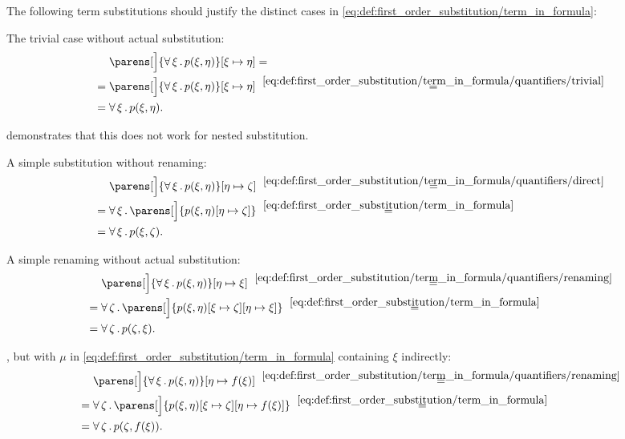 \begin{example}\label{ex:first_order_substitution}
  The following term substitutions should justify the distinct cases in \eqref{eq:def:first_order_substitution/term_in_formula}:
  \begin{thmenum}
     The trivial case without actual substitution:
    \begin{align*}
      &\phantom{{}={}}
      \parens[\Big]{\qforall \xi p(\xi, \eta)}[\xi \mapsto \eta]
      = \\ &=
      \parens[\Big]{\qforall \xi p(\xi, \eta)}[\xi \mapsto \eta]
      \reloset {\eqref{eq:def:first_order_substitution/term_in_formula/quantifiers/trivial}} = \\ &=
      \qforall \xi p(\xi, \eta).
    \end{align*}

     demonstrates that this does not work for nested substitution.

     A simple substitution without renaming:
    \begin{align*}
      &\phantom{{}={}}
      \parens[\Big]{\qforall \xi p(\xi, \eta)}[\eta \mapsto \zeta]
      \reloset {\eqref{eq:def:first_order_substitution/term_in_formula/quantifiers/direct}} = \\ &=
      \qforall \xi \parens[\Big]{p(\xi, \eta)[\eta \mapsto \zeta]}
      \reloset {\eqref{eq:def:first_order_substitution/term_in_formula}} = \\ &=
      \qforall \xi p(\xi, \zeta).
    \end{align*}

     A simple renaming without actual substitution:
    \begin{align*}
      &\phantom{{}={}}
      \parens[\Big]{\qforall \xi p(\xi, \eta)}[\eta \mapsto \xi]
      \reloset {\eqref{eq:def:first_order_substitution/term_in_formula/quantifiers/renaming}} = \\ &=
      \qforall \zeta \parens[\Big]{p(\xi, \eta)[\xi \mapsto \zeta][\eta \mapsto \xi]}
      \reloset {\eqref{eq:def:first_order_substitution/term_in_formula}} = \\ &=
      \qforall \zeta p(\zeta, \xi).
    \end{align*}

     , but with \( \mu \) in \eqref{eq:def:first_order_substitution/term_in_formula} containing \( \xi \) indirectly:
    \begin{align*}
      &\phantom{{}={}}
      \parens[\Big]{\qforall \xi p(\xi, \eta)}[\eta \mapsto f(\xi)]
      \reloset {\eqref{eq:def:first_order_substitution/term_in_formula/quantifiers/renaming}} = \\ &=
      \qforall \zeta \parens[\Big]{p(\xi, \eta)[\xi \mapsto \zeta][\eta \mapsto f(\xi)]}
      \reloset {\eqref{eq:def:first_order_substitution/term_in_formula}} = \\ &=
      \qforall \zeta p(\zeta, f(\xi)).
    \end{align*}


\end{thmenum}
\end{example}
